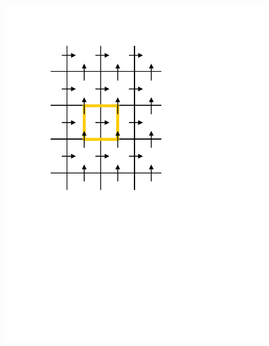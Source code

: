 \begin{figure}[htbp]
\hspace{-0.1in}
\includegraphics[scale=0.47]{../figures/Grids/Staggered-CV-u.pdf}
\hspace{0.3in}

\end{figure}

